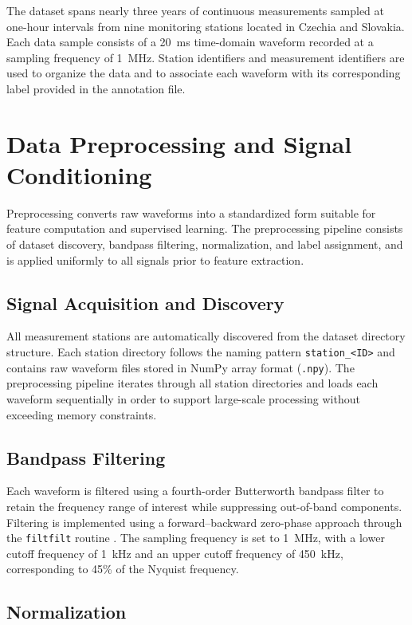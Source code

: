 The dataset spans nearly three years of continuous measurements sampled at one-hour intervals from nine monitoring stations located in Czechia and Slovakia. Each data sample consists of a 20~ms time-domain waveform recorded at a sampling frequency of 1~MHz. Station identifiers and measurement identifiers are used to organize the data and to associate each waveform with its corresponding label provided in the annotation file.

\section{Data Preprocessing and Signal Conditioning}

Preprocessing converts raw waveforms into a standardized form suitable for feature computation and supervised learning. The preprocessing pipeline consists of dataset discovery, bandpass filtering, normalization, and label assignment, and is applied uniformly to all signals prior to feature extraction.

\subsection{Signal Acquisition and Discovery}

All measurement stations are automatically discovered from the dataset directory structure. Each station directory follows the naming pattern \texttt{station\_<ID>} and contains raw waveform files stored in NumPy array format (\texttt{.npy}). The preprocessing pipeline iterates through all station directories and loads each waveform sequentially in order to support large-scale processing without exceeding memory constraints.

\subsection{Bandpass Filtering}

Each waveform is filtered using a fourth-order Butterworth bandpass filter to retain the frequency range of interest while suppressing out-of-band components. Filtering is implemented using a forward--backward zero-phase approach through the \texttt{filtfilt} routine \parencite{Sun_2019_1}. The sampling frequency is set to 1~MHz, with a lower cutoff frequency of 1~kHz and an upper cutoff frequency of 450~kHz, corresponding to 45\% of the Nyquist frequency.

\subsection{Normalization}


